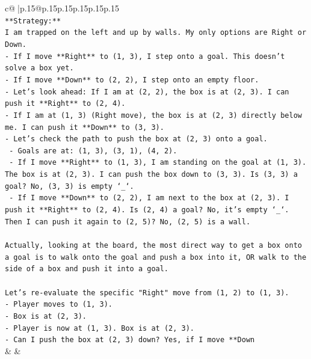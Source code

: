 \documentclass{article}
\begin{document}
{\begin{supertabular}{c@{$\;$}|p{.15\linewidth}@{}p{.15\linewidth}p{.15\linewidth}p{.15\linewidth}p{.15\linewidth}p{.15\linewidth}}
{{{\\ 
\texttt{**Strategy:**} \\
\texttt{I am trapped on the left and up by walls. My only options are Right or Down.} \\
\texttt{{-} If I move **Right** to (1, 3), I step onto a goal. This doesn't solve a box yet.} \\
\texttt{{-} If I move **Down** to (2, 2), I step onto an empty floor.} \\
\texttt{{-} Let's look ahead: If I am at (2, 2), the box is at (2, 3). I can push it **Right** to (2, 4).} \\
\texttt{{-} If I am at (1, 3) (Right move), the box is at (2, 3) directly below me. I can push it **Down** to (3, 3).} \\
\texttt{{-} Let's check the path to push the box at (2, 3) onto a goal.} \\
\texttt{  {-} Goals are at: (1, 3), (3, 1), (4, 2).} \\
\texttt{  {-} If I move **Right** to (1, 3), I am standing on the goal at (1, 3). The box is at (2, 3). I can push the box down to (3, 3). Is (3, 3) a goal? No, (3, 3) is empty `\_`.} \\
\texttt{  {-} If I move **Down** to (2, 2), I am next to the box at (2, 3). I push it **Right** to (2, 4). Is (2, 4) a goal? No, it's empty `\_`. Then I can push it again to (2, 5)? No, (2, 5) is a wall.} \\
\\ 
\texttt{Actually, looking at the board, the most direct way to get a box onto a goal is to walk onto the goal and push a box into it, OR walk to the side of a box and push it into a goal.} \\
\\ 
\texttt{Let's re{-}evaluate the specific "Right" move from (1, 2) to (1, 3).} \\
\texttt{{-} Player moves to (1, 3).} \\
\texttt{{-} Box is at (2, 3).} \\
\texttt{{-} Player is now at (1, 3). Box is at (2, 3).} \\
\texttt{{-} Can I push the box at (2, 3) down? Yes, if I move **Down} \\
            }
        }
    }
    & & \\ \\


\end{supertabular}}
\end{document}
